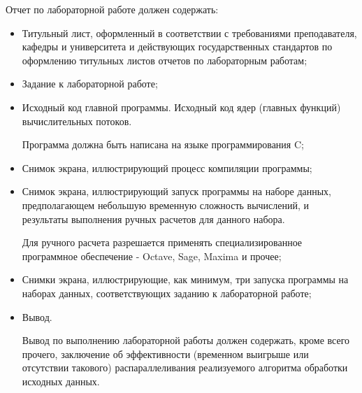 
Отчет по лабораторной работе должен содержать:

\begin{itemize}

	\item Титульный лист, оформленный в соответствии с требованиями преподавателя, кафедры и университета и действующих государственных стандартов по оформлению титульных листов отчетов по лабораторным работам;
	
	\item Задание к лабораторной работе;

	\item Исходный код главной программы. Исходный код ядер (главных функций) вычислительных потоков.

	Программа должна быть написана на языке программирования C;

	\item Снимок экрана, иллюстрирующий процесс компиляции программы;

	\item Снимок экрана, иллюстрирующий запуск программы на наборе данных, предполагающем небольшую временную сложность вычислений, и результаты выполнения ручных расчетов для данного набора.

	Для ручного расчета разрешается применять специализированное программное обеспечение - Octave, Sage, Maxima и прочее;

	\item Снимки экрана, иллюстрирующие, как минимум, три запуска программы на наборах данных, соответствующих заданию к лабораторной работе;

	\item Вывод.

	Вывод по выполнению лабораторной работы должен содержать, кроме всего прочего, заключение об эффективности (временном выигрыше или отсутствии такового) распараллеливания реализуемого алгоритма обработки исходных данных.

\end{itemize}

